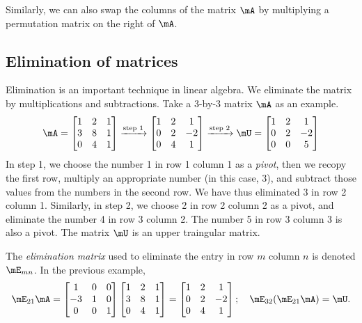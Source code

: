 \documentclass[11pt]{article}
\theoremstyle{plain}
\theoremstyle{definition}
\begin{document}
\vspace{.2cm}
Similarly, we can also swap the columns of the matrix $\mA$ by multiplying a permutation matrix on the right of $\mA$.

\subsection{Elimination of matrices}
Elimination is an important technique in linear algebra. We eliminate the matrix by multiplications and subtractions. Take a 3-by-3 matrix $\mA$ as an example.
\begin{align}
	\mA = \begin{bmatrix}
		1 &2&1\\3 & 8 & 1\\ 0 & 4 & 1 
	\end{bmatrix}
	\xrightarrow{\text{step 1}} \begin{bmatrix}
		1 &2&1\\0 & 2 & -2\\ 0 & 4 & 1 
	\end{bmatrix}
	\xrightarrow{\text{step 2}} \mU =  \begin{bmatrix}
		1 &2&1\\0 & 2 & -2\\ 0 & 0 & 5
	\end{bmatrix}
\end{align}
In step 1, we choose the number 1 in row 1 column 1 as a \textit{pivot}, then we recopy the first row, multiply an appropriate number (in this case, 3), and subtract those values from the numbers in the second row. We have thus eliminated 3 in row 2 column 1. Similarly, in step 2, we choose 2 in row 2 column 2 as a pivot, and eliminate the number 4 in row 3 column 2.  The number 5 in row 3 column 3 is also a pivot. The matrix $\mU$ is an upper traingular matrix.

\vspace{.2cm}
The \textit{elimination matrix} used to eliminate the entry in row $m$ column $n$ is denoted $\mE_{mn}$. In the previous example, 
\begin{align}
\mE_{21} \mA = 
\begin{bmatrix}
		1 &0&0\\-3 & 1 & 0\\ 0 & 0 & 1 
	\end{bmatrix}
	\begin{bmatrix}
		1 &2&1\\3 & 8 & 1\\ 0 & 4 & 1 
	\end{bmatrix} = \begin{bmatrix}
		1 &2&1\\0 & 2 & -2\\ 0 & 4 & 1 
	\end{bmatrix};\quad \mE_{32} (\mE_{21} \mA) = \mU.
\end{align}
\end{document}
